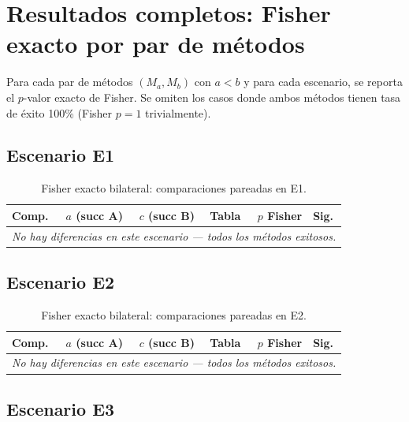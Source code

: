 \documentclass[12pt,a4paper,oneside]{book}
\begin{document}
\newpage
\section{Resultados completos: Fisher exacto por par de métodos}

Para cada par de métodos $(M_a, M_b)$ con $a < b$ y para cada escenario, se reporta el $p$-valor exacto de Fisher. Se omiten los casos donde ambos métodos tienen tasa de éxito 100\% (Fisher $p = 1$ trivialmente).

\subsection{Escenario E1}

\begin{table}[H]
\centering
\caption{Fisher exacto bilateral: comparaciones pareadas en E1.}
\begin{tabular}{lcccrl}
\toprule
\textbf{Comp.} & \textbf{$a$ (succ A)} & \textbf{$c$ (succ B)} & \textbf{Tabla} & \textbf{$p$ Fisher} & \textbf{Sig.} \\
\midrule
\multicolumn{6}{c}{\textit{No hay diferencias en este escenario --- todos los métodos exitosos.}} \\
\bottomrule
\end{tabular}
\end{table}

\subsection{Escenario E2}

\begin{table}[H]
\centering
\caption{Fisher exacto bilateral: comparaciones pareadas en E2.}
\begin{tabular}{lcccrl}
\toprule
\textbf{Comp.} & \textbf{$a$ (succ A)} & \textbf{$c$ (succ B)} & \textbf{Tabla} & \textbf{$p$ Fisher} & \textbf{Sig.} \\
\midrule
\multicolumn{6}{c}{\textit{No hay diferencias en este escenario --- todos los métodos exitosos.}} \\
\bottomrule
\end{tabular}
\end{table}

\subsection{Escenario E3}
\end{document}
